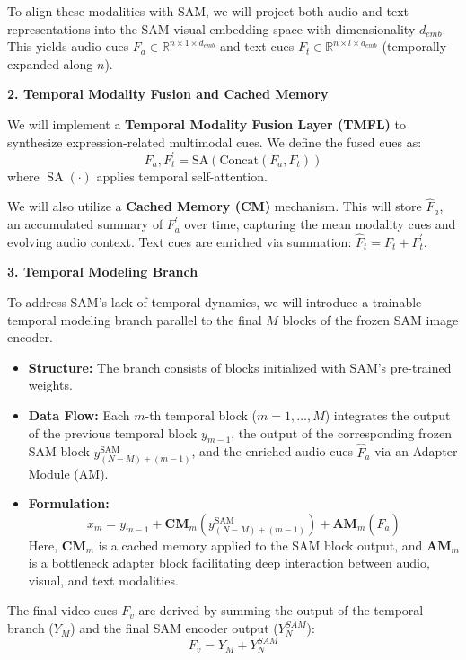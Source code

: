To align these modalities with SAM, we will project both audio and text representations into the SAM visual embedding space with dimensionality $d_{emb}$. This yields audio cues $F_{a} \in \mathbb{R}^{n \times 1 \times d_{emb}}$ and text cues $F_{t} \in \mathbb{R}^{n \times l \times d_{emb}}$ (temporally expanded along $n$).

\vspace{0.5em}
\noindent\textbf{2. Temporal Modality Fusion and Cached Memory}

We will implement a \textbf{Temporal Modality Fusion Layer (TMFL)} to synthesize expression-related multimodal cues. We define the fused cues as:
\[ F_{a}^{\prime}, F_{t}^{\prime} = \mathrm{SA}(\mathrm{Concat}(F_{a}, F_{t})) \]
where $\operatorname{SA}(\cdot)$ applies temporal self-attention.

We will also utilize a \textbf{Cached Memory (CM)} mechanism. This will store $\hat{F}_{a}$, an accumulated summary of $F_{a}^{\prime}$ over time, capturing the mean modality cues and evolving audio context. Text cues are enriched via summation: $\hat{F}_{t} = F_{t} + F_{t}^{\prime}$.

\vspace{0.5em}
\noindent\textbf{3. Temporal Modeling Branch}

To address SAM's lack of temporal dynamics, we will introduce a trainable temporal modeling branch parallel to the final $M$ blocks of the frozen SAM image encoder.
\begin{itemize}
    \item \textbf{Structure:} The branch consists of blocks initialized with SAM's pre-trained weights.
    \item \textbf{Data Flow:} Each $m$-th temporal block ($m = 1, \dots, M$) integrates the output of the previous temporal block $y_{m-1}$, the output of the corresponding frozen SAM block $y_{(N-M)+(m-1)}^{\mathrm{SAM}}$, and the enriched audio cues $\hat{F}_{a}$ via an Adapter Module (AM).
    \item \textbf{Formulation:}
    \[ x_{m} = y_{m-1} + \mathbf{CM}_{m}(y_{(N-M)+(m-1)}^{\mathrm{SAM}}) + \mathbf{AM}_{m}(\hat{F}_{a}) \]
    Here, $\mathbf{CM}_{m}$ is a cached memory applied to the SAM block output, and $\mathbf{AM}_{m}$ is a bottleneck adapter block facilitating deep interaction between audio, visual, and text modalities.
\end{itemize}

The final video cues $F_{v}$ are derived by summing the output of the temporal branch ($Y_{M}$) and the final SAM encoder output ($Y_{N}^{SAM}$):
\[ F_{v} = Y_{M} + Y_{N}^{SAM} \]

